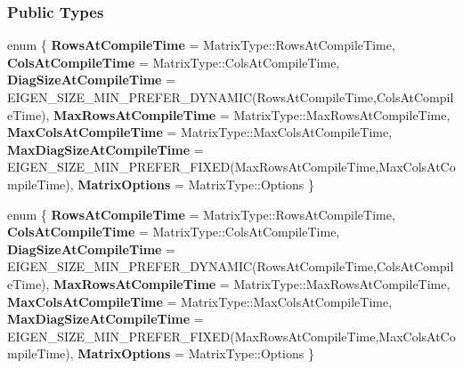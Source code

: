 \subsubsection*{Public Types}
\begin{DoxyCompactItemize}
\item 
\mbox{\label{group___s_v_d___module_ab36afb73046cc87978fc1f1ce2841ac5}} 
enum \{ \newline
{\bfseries Rows\+At\+Compile\+Time} = Matrix\+Type\+:\+:Rows\+At\+Compile\+Time, 
{\bfseries Cols\+At\+Compile\+Time} = Matrix\+Type\+:\+:Cols\+At\+Compile\+Time, 
{\bfseries Diag\+Size\+At\+Compile\+Time} = E\+I\+G\+E\+N\+\_\+\+S\+I\+Z\+E\+\_\+\+M\+I\+N\+\_\+\+P\+R\+E\+F\+E\+R\+\_\+\+D\+Y\+N\+A\+M\+IC(Rows\+At\+Compile\+Time,Cols\+At\+Compile\+Time), 
{\bfseries Max\+Rows\+At\+Compile\+Time} = Matrix\+Type\+:\+:Max\+Rows\+At\+Compile\+Time, 
\newline
{\bfseries Max\+Cols\+At\+Compile\+Time} = Matrix\+Type\+:\+:Max\+Cols\+At\+Compile\+Time, 
{\bfseries Max\+Diag\+Size\+At\+Compile\+Time} = E\+I\+G\+E\+N\+\_\+\+S\+I\+Z\+E\+\_\+\+M\+I\+N\+\_\+\+P\+R\+E\+F\+E\+R\+\_\+\+F\+I\+X\+ED(Max\+Rows\+At\+Compile\+Time,Max\+Cols\+At\+Compile\+Time), 
{\bfseries Matrix\+Options} = Matrix\+Type\+:\+:Options
 \}
\item 
\mbox{\label{group___s_v_d___module_ac5975536a785bed7315d4e5edbcd7b81}} 
enum \{ \newline
{\bfseries Rows\+At\+Compile\+Time} = Matrix\+Type\+:\+:Rows\+At\+Compile\+Time, 
{\bfseries Cols\+At\+Compile\+Time} = Matrix\+Type\+:\+:Cols\+At\+Compile\+Time, 
{\bfseries Diag\+Size\+At\+Compile\+Time} = E\+I\+G\+E\+N\+\_\+\+S\+I\+Z\+E\+\_\+\+M\+I\+N\+\_\+\+P\+R\+E\+F\+E\+R\+\_\+\+D\+Y\+N\+A\+M\+IC(Rows\+At\+Compile\+Time,Cols\+At\+Compile\+Time), 
{\bfseries Max\+Rows\+At\+Compile\+Time} = Matrix\+Type\+:\+:Max\+Rows\+At\+Compile\+Time, 
\newline
{\bfseries Max\+Cols\+At\+Compile\+Time} = Matrix\+Type\+:\+:Max\+Cols\+At\+Compile\+Time, 
{\bfseries Max\+Diag\+Size\+At\+Compile\+Time} = E\+I\+G\+E\+N\+\_\+\+S\+I\+Z\+E\+\_\+\+M\+I\+N\+\_\+\+P\+R\+E\+F\+E\+R\+\_\+\+F\+I\+X\+ED(Max\+Rows\+At\+Compile\+Time,Max\+Cols\+At\+Compile\+Time), 
{\bfseries Matrix\+Options} = Matrix\+Type\+:\+:Options
 \}
\item 
\mbox{\label{group___s_v_d___module_a2b526fed1f4280249d759b09cadcfded}} 

\end{DoxyCompactItemize}
